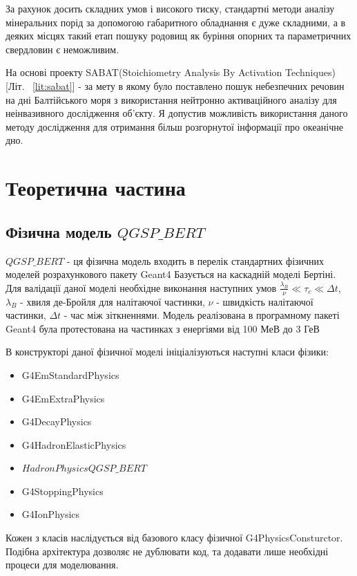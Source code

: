 \documentclass[a4paper, 14pt]{article}
\numberwithin{equation}{section}
\numberwithin{table}{section}
\begin{document}
За рахунок досить складних умов і високого тиску, стандартні методи аналізу мінеральних порід за допомогою габаритного обладнання є дуже складними, а в деяких місцях такий етап пошуку родовищ як буріння опорних та параметричних свердловин є неможливим.

На основі проекту SABAT(Stoichiometry Analysis By Activation Techniques)[Літ. ~\ref{lit:sabat}] - за мету в якому було поставлено пошук небезпечних речовин на дні Балтійського моря з використання нейтронно активаційного аналізу для неінвазивного дослідження об'єкту. Я допустив можливість використання даного методу дослідження для отримання більш розгорнутої інформації про океанічне дно.		

\newpage
\section{Теоретична частина}
\setcounter{figure}{0} 
\subsection{Фізична модель $QGSP\_BERT$}
$QGSP\_BERT$ - ця фізична модель входить в перелік стандартних фізичних моделей розрахункового пакету Geant4
Базується на каскадній моделі Бертіні. Для валідації даної моделі необхідне виконання наступних умов $\frac{\lambda_B}{\nu} \ll \tau_c \ll \Delta{t}$, $\lambda_B$ - хвиля де-Бройля для налітаючої частинки, $\nu$ - швидкість налітаючої частинки, $\Delta{t}$ - час між зіткненнями. 
Модель реалізована в програмному пакеті Geant4 була протестована на частинках з енергіями від 100 МеВ до 3 ГеВ

В конструкторі даної фізичної моделі ініціалізуються наступні класи фізики: 
\begin{itemize}
	\item G4EmStandardPhysics
	\item G4EmExtraPhysics
	\item G4DecayPhysics
	\item G4HadronElasticPhysics
	\item $HadronPhysicsQGSP\_BERT$
	\item G4StoppingPhysics
	\item G4IonPhysics
\end{itemize}
Кожен з класів наслідується від базового класу фізичної G4PhysicsConsturctor. Подібна архітектура дозволяє не дублювати код, та додавати лише необхідні процеси для моделювання.
\end{document}
